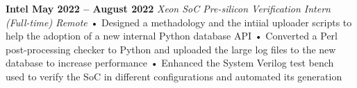 \documentclass[../main.tex]{subfiles}
\begin{document}
%
\noindent\textbf{{\fontsize{\textFontSize}{\textFontBox}\selectfont Intel \hfill May 2022 – August 2022}}
\vspace{\jobHeaderDist}\newline
%
{\fontsize{\textFontSize}{\textFontBox}\selectfont\emph{Xeon SoC Pre-silicon Verification Intern (Full-time) \hfill Remote \hspace{0 cm}}}
\newline
%
%
{\fontsize{\textFontSize}{\textFontBox}\selectfont • \hspace{1mm} Designed a methadology and the intiial uploader scripts to help the adoption of a new internal Python database API }\newline
{\fontsize{\textFontSize}{\textFontBox}\selectfont • \hspace{1mm} Converted a Perl post-processing checker to Python and uploaded the large log files to the new database to increase performance }\newline
{\fontsize{\textFontSize}{\textFontBox}\selectfont • \hspace{1mm} Enhanced the System Verilog test bench used to verify the SoC in different configurations and automated its generation }\newline
%
%
\end{document}
